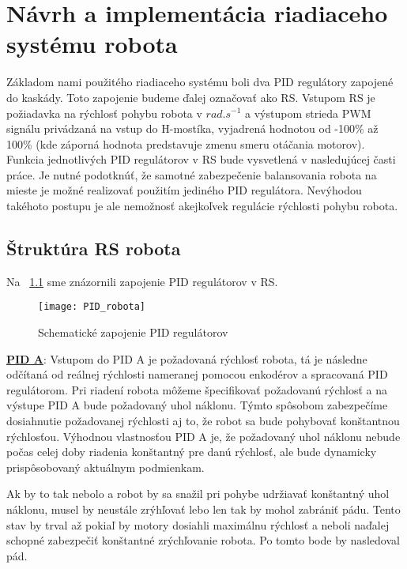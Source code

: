 \chapter{Návrh a implementácia riadiaceho systému robota}
Základom nami použitého riadiaceho systému boli dva PID regulátory zapojené do kaskády. Toto zapojenie budeme ďalej označovať ako \ac{RS}. Vstupom RS je požiadavka na rýchlosť pohybu robota v $rad.s^{-1}$ a výstupom strieda PWM signálu privádzaná na vstup do H-mostíka, vyjadrená hodnotou od -100\% až 100\% (kde záporná hodnota predstavuje zmenu smeru otáčania motorov). Funkcia jednotlivých PID regulátorov v RS bude vysvetlená v nasledujúcej časti práce. Je nutné podotknúť, že samotné zabezpečenie balansovania robota na mieste je možné realizovať použitím jediného PID regulátora. Nevýhodou takéhoto postupu je ale nemožnosť akejkoľvek regulácie rýchlosti pohybu robota. 

\section{Štruktúra RS robota}

Na \figurename~\ref{fig:RS} sme znázornili zapojenie PID regulátorov v RS.  

\begin{figure}[h]
\centering
\texttt{[image: PID\_robota]}
\caption{Schematické zapojenie PID regulátorov}
\label{fig:RS}
\end{figure}

\underline{\textbf{PID A}}:
Vstupom do PID A je požadovaná rýchlosť robota, tá je následne odčítaná od reálnej rýchlosti nameranej pomocou enkodérov a spracovaná PID regulátorom. Pri riadení robota môžeme špecifikovať požadovanú rýchlosť a na výstupe PID A bude požadovaný uhol náklonu. Týmto spôsobom zabezpečíme  dosiahnutie požadovanej rýchlosti aj to, že robot sa bude pohybovať konštantnou rýchlosťou. Výhodnou vlastnosťou PID A je, že požadovaný uhol náklonu nebude počas celej doby riadenia konštantný pre danú rýchlosť, ale bude dynamicky prispôsobovaný aktuálnym podmienkam. 

Ak by to tak nebolo a robot by sa snažil pri pohybe udržiavať konštantný uhol náklonu, musel by neustále zrýhľovať lebo len tak by mohol zabrániť pádu. Tento stav by trval až pokiaľ by motory dosiahli maximálnu rýchlosť a neboli naďalej schopné zabezpečiť konštantné zrýchľovanie robota. Po tomto bode by nasledoval pád.


